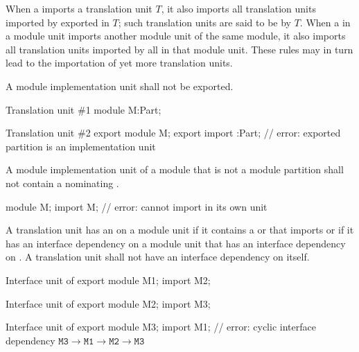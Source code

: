\pnum
When a  imports
a translation unit $T$, it also imports
all translation units imported by
exported 
in $T$; such translation units are
said to be  by $T$.
When a  in a module unit imports
another module unit of the same module, it also imports
all translation units imported by
all 
in that module unit.
These rules may in turn lead to the importation of yet more
translation units.

\pnum
A module implementation unit shall not be exported.
\begin{example}
\begin{codeblocktu}{Translation unit \#1}
module M:Part;
\end{codeblocktu}

\begin{codeblocktu}{Translation unit \#2}
export module M;
export import :Part;    // error: exported partition  is an implementation unit
\end{codeblocktu}
\end{example}

\pnum
A module implementation unit of a module 
that is not a module partition
shall not contain a 
nominating .
\begin{example}
\begin{codeblock}
module M;
import M;               // error: cannot import  in its own unit
\end{codeblock} 
\end{example}

\pnum
A translation unit has an  on a module unit 
if it contains a  or
 that imports  or if it has
an interface dependency on a module unit that has an interface dependency on .
A translation unit shall not have an interface dependency on itself.
\begin{example}
\begin{codeblocktu}{Interface unit of }
export module M1;
import M2;
\end{codeblocktu}

\begin{codeblocktu}{Interface unit of }
export module M2;
import M3;
\end{codeblocktu}

\begin{codeblocktu}{Interface unit of }
export module M3;
import M1;              // error: cyclic interface dependency $\mathtt{M3} \rightarrow \mathtt{M1} \rightarrow \mathtt{M2} \rightarrow \mathtt{M3}$
\end{codeblocktu}
\end{example}

